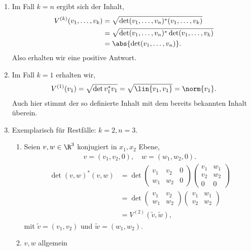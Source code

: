 \begin{prop}
\label{prop:4.17}
\begin{enumerate}[label=\arabic{*}.)]
  \item Im Fall $k=n$ ergibt sich der Inhalt,
\begin{align*}
V^{(k)}(v_1,\ldots,v_k) &= \sqrt{\det (v_1,\ldots,v_n)^*(v_1,\ldots,v_k)}
\\ &= \sqrt{\det (v_1,\ldots,v_n)^*\det(v_1,\ldots,v_k)}
\\ &= \abs{\det(v_1,\ldots,v_n)}.
\end{align*}
Also erhalten wir eine positive Antwort.
\item Im Fall $k=1$ erhalten wir,
\begin{align*}
V^{(1)}(v_1) = \sqrt{\det v_1^* v_1} = \sqrt{\lin{v_1,v_1}} = \norm{v_1}.
\end{align*}
Auch hier stimmt der so definierte Inhalt mit dem bereits bekannten Inhalt
überein.
\item Exemplarisch für Restfälle: $k=2, n=3$.
\begin{enumerate}[label=(\alph{*})]
\item Seien $v,w\in\R^3$ konjugiert in $x_1,x_2$ Ebene,
\begin{align*}
v = (v_1,v_2,0),\quad w = (w_1, w_2, 0).
\end{align*}
\begin{align*}
\det (v,w)^* (v,w)
&= \det \begin{pmatrix}
v_1 &v_2& 0\\ w_1& w_2& 0
\end{pmatrix} 
\begin{pmatrix}
v_1 & w_1\\
v_2 & w_2\\
0 & 0
\end{pmatrix}
\\ &= \det \begin{pmatrix}
v_1 &v_2\\ w_1& w_2
\end{pmatrix} 
\begin{pmatrix}
v_1 & w_1\\
v_2 & w_2
\end{pmatrix}
\\ &= V^{(2)}(\tilde{v},\tilde{w}),
\end{align*}
mit $\tilde{v} = (v_1,v_2)$ und $\tilde{w} = (w_1,w_2)$.
\item $v,w$ allgemein


\end{enumerate}
\end{enumerate}
\end{prop}
